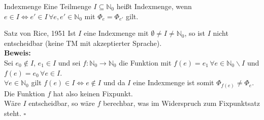 \begin{defn}{Indexmenge}
    Eine Teilmenge $I \subseteq \mathbb{N}_0$ heißt Indexmenge, wenn $e \in I \Leftrightarrow e' \in I \, \forall e,e' \in \mathbb{N}_0$
    mit $\Phi_e = \Phi_{e'}$ gilt.
\end{defn}

\begin{satz}{Satz von Rice, 1951}
    Ist $I$ eine Indexmenge mit $\emptyset \neq I \neq \mathbb{N}_0$, so ist $I$ nicht entscheidbar (keine TM mit akzeptierter Sprache). \\

    \textbf{Beweis:} \\
    Sei $e_0 \notin I$, $e_1 \in I$ und sei $f: \mathbb{N}_0 \rightarrow \mathbb{N}_0$ die Funktion mit 
    $f(e) = e_1 \, \forall e \in \mathbb{N}_0 \backslash I$ und $f(e) = e_0 \, \forall e \in I$. \\

    $\forall e \in \mathbb{N}_0$ gilt $f(e) \in I \Leftrightarrow e \notin I$ und da $I$ eine Indexmenge ist somit 
    $\Phi_{f(e)} \neq \Phi_e$. Die Funktion $f$ hat also keinen Fixpunkt. \\
    
    Wäre $I$ entscheidbar, so wäre $f$ berechbar, was im Widerspruch zum Fixpunktsatz steht.
    $\square$
\end{satz}

